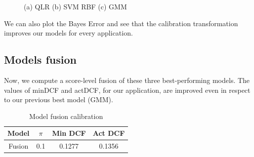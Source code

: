 \documentclass[12pt, a4paper]{article}
\begin{document}
\begin{figure}[ht]
    \centering
    \caption{(a) QLR (b) SVM RBF (c) GMM }
    \label{fig:Calibration_all_models}
\end{figure}

We can also plot the Bayes Error and see that the calibration transformation improves our models for every application.

\subsection{Models fusion}
Now, we compute a score-level fusion of these three best-performing models. The values of minDCF and actDCF, for our application, are improved even in respect to our previous best model (GMM).

\begin{table}[ht!]
	\centering
 	\begin{tabular}{| | c c c c | |} 
 		\hline
 		Model & $\pi$ & Min DCF & Act DCF\\
 		\hline\hline
 		Fusion & 0.1 &  0.1277 & 0.1356\\
 		\hline
 	\end{tabular}
	\caption{Model fusion calibration}
\end{table}
\end{document}
